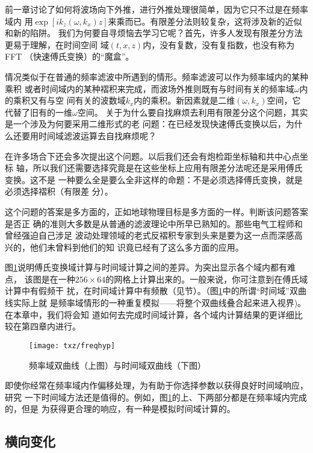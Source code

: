 前一章讨论了如何将波场向下外推，进行外推处理很简单，因为它只不过是在频率域内
用$\exp[ik_z(\omega,k_x)z]$来乘而已。有限差分法则较复杂，这将涉及新的近似和新的陷阱。
我们为何要自寻烦恼去学习它呢？首先，许多人发现有限差分方法更易于理解，在时间空间
域$(t,x,z)$内，没有复数，没有复指数，也没有称为FFT
（快速傅氏变换）的“魔盒”。

情况类似于在普通的频率滤波中所遇到的情形。频率滤波可以作为频率域内的某种乘积
或者时间域内的某种褶积来完成，而波场外推则既有与时间有关的频率域$\omega$内的乘积又有与空
间有关的波数域$k_x$内的乘积。新因素就是二维$(\omega,k_x)$空间，它代替了旧有的一维$\omega$空间。
关于为什么要自找麻烦去利用有限差分这个问题，其实是一个涉及为何要采用二维形式的老
问题：在已经发现快速傅氏变换以后，为什么还要用时间域滤波运算去自找麻烦呢？

在许多场合下还会多次提出这个问题。以后我们还会有炮检距坐标轴和共中心点坐标
轴，所以我们还需要选择究竟是在这些坐标上应用有限差分法呢还是采用傅氏变换。这不是
一种要么全是要么全非这样的命题：不是必须选择傅氏变换，就是必须选择褶积（有限差
分）。

这个问题的答案是多方面的，正如地球物理目标是多方面的一样。判断该问题答案是否正
确的准则大多数是从普通的滤波理论中所早已熟知的。那些电气工程师和曾经强迫自己涉足
波动处理领域的老式反褶积专家到头来是要为这一点而深感高兴的，他们未曾料到他们的知
识竟已经有了这么多方面的应用。

图\ref{fig:txz/freqhyp}说明傅氏变换域计算与时间域计算之间的差异。为突出显示各个域内都有难点，
该图是在一种$256\times64$的网格上计算出来的。一般来说，你可注意到在傅氏域计算中有假频干
扰，在时间域计算中有频散（见\label{sec:4.3}节）。（图\ref{fig:txz/freqhyp}中的所谓“时间域”双曲线实际上就
是频率域情形的一种重复模拟——将整个双曲线叠合起来进入视界)。在本章中，我们将会知
道如何去完成时间域计算，各个域内计算结果的更详细比较在第四章内进行。
\begin{figure}[H]
\centering
\texttt{[image: txz/freqhyp]}
\caption[freqhyp]{频率域双曲线（上图）与时间域双曲线（下图）}
\label{fig:txz/freqhyp}
\end{figure}

即使你经常在频率域内作偏移处理，为有助于你选择参数以获得良好时间域响应，研究
一下时间域方法还是值得的。例如，图\ref{fig:txz/freqhyp}的上、下两部分都是在频率域内完成的，但是
为获得更合理的响应，有一种是模拟时间域计算的。

\subsection{横向变化}
\label{sec:2.0.1}

